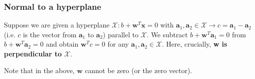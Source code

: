 \documentclass[titlepage, 12pt, leqno]{article}
\begin{document}
\subsubsection{Normal to a hyperplane}
Suppose we are given a hyperplane $\mathcal{X} : b + \textbf{w}^{T}\textbf{x}=0$
with $\textbf{a}_{1}, \textbf{a}_{2} \in \mathcal{X} \rightarrow c = 
\textbf{a}_{1}-\textbf{a}_{2}$ (i.e. $c$ is the vector from $\textbf{a}_{1}$
to $\textbf{a}_{2}$) parallel to $\mathcal{X}$. We subtract 
$b + \textbf{w}^{T}\textbf{a}_{1}=0$ from $b+\textbf{w}^{T}\textbf{a}_{2}=0$ and
obtain $\textbf{w}^{T}c=0$ for any $\textbf{a}_{1},\textbf{a}_{2}\in \mathcal{X}$.
Here, crucially, \textbf{w is perpendicular to $\mathcal{X}$}.

\begin{note}
    Note that in the above, $\textbf{w}$ cannot be zero (or the zero vector).
\end{note}
\end{document}
